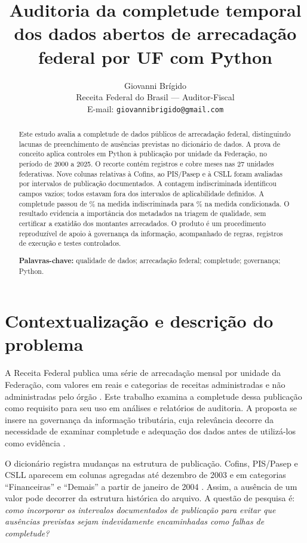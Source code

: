 \documentclass[12pt,a4paper]{article}
\title{Auditoria da completude temporal dos dados abertos de arrecadação federal por UF com Python}
\author{Giovanni Brígido\\
\small Receita Federal do Brasil --- Auditor-Fiscal\\
\small E-mail: \texttt{giovannibrigido@gmail.com}}
\date{}
\begin{document}
\maketitle
\begin{abstract}
Este estudo avalia a completude de dados públicos de arrecadação federal,
distinguindo lacunas de preenchimento de ausências previstas no dicionário de
dados. A prova de conceito aplica controles em Python à publicação por unidade
da Federação, no período de 2000 a 2025. O recorte contém \NRegistros{}
registros e cobre \NMeses{} meses nas 27 unidades federativas. Nove colunas
relativas à Cofins, ao PIS/Pasep e à CSLL foram avaliadas por intervalos de
publicação documentados. A contagem indiscriminada identificou \NAusencias{}
campos vazios; todos estavam fora dos intervalos de aplicabilidade definidos.
A completude passou de \CIngenua{}\% na medida indiscriminada para
\CCondicionada{}\% na medida condicionada. O resultado evidencia a importância
dos metadados na triagem de qualidade, sem certificar a exatidão dos montantes
arrecadados. O produto é um procedimento reproduzível de apoio à governança
da informação, acompanhado de regras, registros de execução e testes controlados.

\noindent\textbf{Palavras-chave:} qualidade de dados; arrecadação federal;
completude; governança; Python.
\end{abstract}

\section{Contextualização e descrição do problema}
A Receita Federal publica uma série de arrecadação mensal por unidade da
Federação, com valores em reais e categorias de receitas administradas e não
administradas pelo órgão \cite{rfbDados,rfbDicionario}. Este trabalho examina a
completude dessa publicação como requisito para seu uso em análises e
relatórios de auditoria. A proposta se insere na governança da informação
tributária, cuja relevância decorre da necessidade
de examinar completude e adequação dos dados antes de utilizá-los como evidência
\cite{gao2019}.

O dicionário registra mudanças na estrutura de publicação. Cofins, PIS/Pasep e
CSLL aparecem em colunas agregadas até dezembro de 2003 e em categorias
``Financeiras'' e ``Demais'' a partir de janeiro de 2004
\cite{rfbDicionario}. Assim, a ausência de um valor pode decorrer da estrutura
histórica do arquivo. A questão de pesquisa é: \textit{como incorporar os
intervalos documentados de publicação para evitar que ausências previstas
sejam indevidamente encaminhadas como falhas de completude?}
\end{document}
